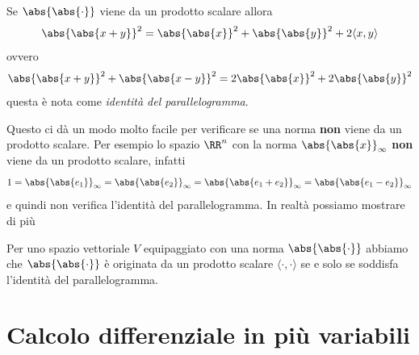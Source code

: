 \documentclass[11pt]{scrartcl}
\begin{document}
	\begin{remark}
		Se $\abs{\abs{\cdot}}$ viene da un prodotto scalare allora 
		$$\abs{\abs{x+y}}^2=\abs{\abs{x}}^2+\abs{\abs{y}}^2+2\langle x,y \rangle$$
		ovvero
		$$\abs{\abs{x+y}}^2+\abs{\abs{x-y}}^2=2\abs{\abs{x}}^2+2\abs{\abs{y}}^2$$
		questa è nota come \textit{identità del parallelogramma}.
	\end{remark}
	Questo ci dà un modo molto facile per verificare se una norma \textbf{non} viene da un prodotto scalare. Per esempio lo spazio $\RR^n$ con la norma $\abs{\abs{x}}_\infty$ \textbf{non} viene da un prodotto scalare, infatti 
	$$1=\abs{\abs{e_1}}_\infty=\abs{\abs{e_2}}_\infty=\abs{\abs{e_1+e_2}}_\infty=\abs{\abs{e_1-e_2}}_\infty$$
	e quindi non verifica l'identità del parallelogramma. In realtà possiamo mostrare di più
	\begin{proposition}
		Per uno spazio vettoriale $V$ equipaggiato con una norma $\abs{\abs{\cdot}}$ abbiamo che $\abs{\abs{\cdot}}$ è originata da un prodotto scalare $\langle \cdot,\cdot\rangle$ se e solo se soddisfa l'identità del parallelogramma.
	\end{proposition}
	
	\newpage
	
	\section{Calcolo differenziale in più variabili}
	
\end{document}
